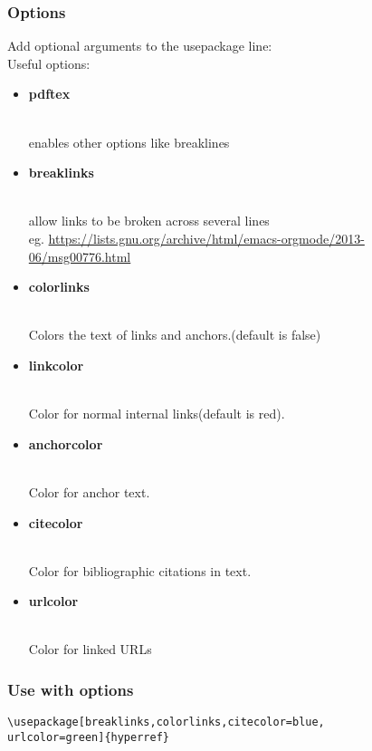 \documentclass[class=article, crop=false, titlepage, twoside, multi={itemize, figure, verbatim}, float=false]{standalone}
\begin{document}
\subsubsection[Options]{\Large Options}
Add optional arguments to the usepackage line:\\
Useful options:\begin{itemize}
\item \begin{large}\textbf{pdftex}\end{large}\\enables other options like breaklines
\item \begin{large}\textbf{breaklinks}\end{large}\\allow links to be broken across several lines\\eg. \url{https://lists.gnu.org/archive/html/emacs-orgmode/2013-06/msg00776.html}
\item \begin{large}\textbf{colorlinks}\end{large}\\Colors the text of links and anchors.(default is false)
\item \begin{large}\textbf{linkcolor}\end{large}\\Color for normal internal links(default is red).
\item \begin{large}\textbf{anchorcolor}\end{large}\\Color for anchor text.
\item \begin{large}\textbf{citecolor}\end{large}\\Color for bibliographic citations in text.
\item \begin{large}\textbf{urlcolor}\end{large}\\Color for linked URLs

\end{itemize}

\subsubsection[Use with Options]{\Large Use with options}
\begin{verbatim}
\usepackage[breaklinks,colorlinks,citecolor=blue,
urlcolor=green]{hyperref}
\end{verbatim}
\end{document}
